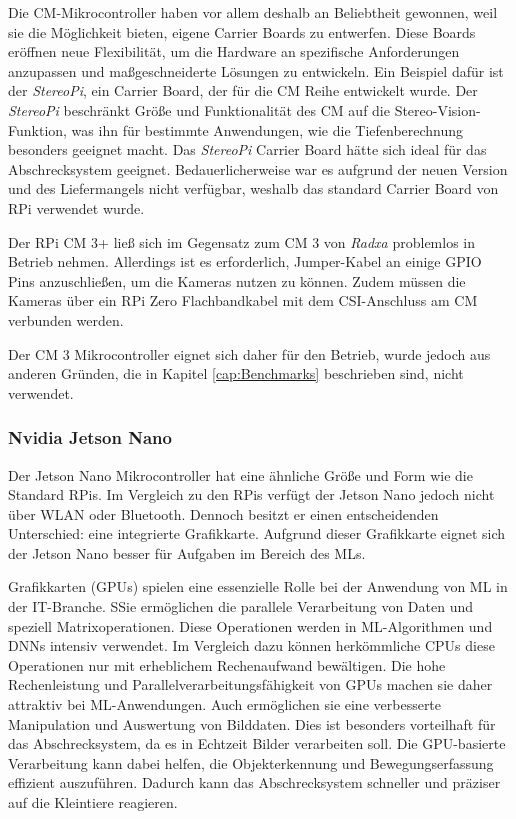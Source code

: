 Die \ac{CM}-Mikrocontroller haben vor allem deshalb an Beliebtheit gewonnen, weil sie die Möglichkeit bieten, eigene Carrier Boards zu entwerfen. Diese Boards eröffnen neue Flexibilität, um die Hardware an spezifische Anforderungen anzupassen und maßgeschneiderte Lösungen zu entwickeln. Ein Beispiel dafür ist der \textit{StereoPi}, ein Carrier Board, der für die \ac{CM} Reihe entwickelt wurde. Der \textit{StereoPi} beschränkt Größe und Funktionalität des \acl{CM} auf die Stereo-Vision-Funktion, was ihn für bestimmte Anwendungen, wie die Tiefenberechnung besonders geeignet macht. Das \textit{StereoPi} Carrier Board hätte sich ideal für das Abschrecksystem geeignet. Bedauerlicherweise war es aufgrund der neuen Version und des Liefermangels nicht verfügbar, weshalb das standard Carrier Board von \acl{RPi} verwendet wurde. \cite{stereopi}

Der \ac{RPi} \ac{CM} 3+ ließ sich im Gegensatz zum \ac{CM} 3 von \textit{Radxa} problemlos in Betrieb nehmen. Allerdings ist es erforderlich, Jumper-Kabel an einige \ac{GPIO} Pins anzuschließen, um die Kameras nutzen zu können. Zudem müssen die Kameras über ein \ac{RPi} Zero Flachbandkabel mit dem \acs{CSI}-Anschluss am \ac{CM} verbunden werden. \cite{cm3}

Der \ac{CM} 3 Mikrocontroller eignet sich daher für den Betrieb, wurde jedoch aus anderen Gründen, die in Kapitel \ref{cap:Benchmarks} beschrieben sind, nicht verwendet.

\subsubsection{Nvidia Jetson Nano}

Der Jetson Nano Mikrocontroller hat eine ähnliche Größe und Form wie die Standard \ac{RPi}s. Im Vergleich zu den \ac{RPi}s verfügt der Jetson Nano jedoch nicht über WLAN oder Bluetooth. Dennoch besitzt er einen entscheidenden Unterschied: eine integrierte Grafikkarte. Aufgrund dieser Grafikkarte eignet sich der Jetson Nano besser für Aufgaben im Bereich des \acl{ML}s. \cite{nvidia_jn}

Grafikkarten (\acs{GPU}s) spielen eine essenzielle Rolle bei der Anwendung von \ac{ML} in der IT-Branche. SSie ermöglichen die parallele Verarbeitung von Daten und speziell Matrixoperationen. Diese Operationen werden in \ac{ML}-Algorithmen und \ac{DNN}s intensiv verwendet. Im Vergleich dazu können herkömmliche CPUs diese Operationen nur mit erheblichem Rechenaufwand bewältigen. Die hohe Rechenleistung und Parallelverarbeitungsfähigkeit von GPUs machen sie daher attraktiv bei \ac{ML}-Anwendungen. Auch ermöglichen sie eine verbesserte Manipulation und Auswertung von Bilddaten. Dies ist besonders vorteilhaft für das Abschrecksystem, da es in Echtzeit Bilder verarbeiten soll.
Die \ac{GPU}-basierte Verarbeitung kann dabei helfen, die Objekterkennung und Bewegungserfassung effizient auszuführen. Dadurch kann das Abschrecksystem schneller und präziser auf die Kleintiere reagieren. \cite{gpus}

